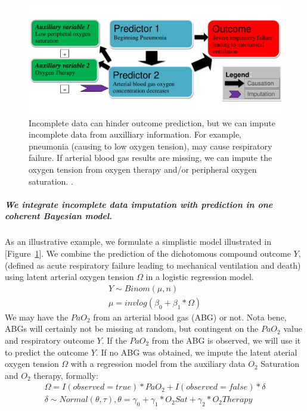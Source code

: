 \documentclass[11pt,notitlepage]{article}
\begin{document}
\begin{figure} 
 \vspace{-30pt}
 \includegraphics[scale=0.4]{Figures/Bayesian_imputation.pdf}
    \vspace{-20pt}
  \caption{\footnotesize Incomplete data can hinder outcome prediction, but we can impute incomplete data from auxilliary information. For example, pneumonia (causing to low oxygen tension), may cause respiratory failure. If arterial blood gas results are missing, we can impute the oxygen tension from oxygen therapy and/or peripheral oxygen saturation. \cite{Hall_25389642}.}
   \vspace{-10pt}
    \label{fig:Imputation_fig}
\end{figure}

\subparagraph{We integrate incomplete data imputation with prediction in one coherent Bayesian model.}
As an illustrative example, we formulate a simplistic model illustrated in [Figure~\ref{fig:Imputation_fig}]. We combine the prediction of the dichotomous compound outcome $Y$,(defined as acute respiratory failure leading to mechanical ventilation and death) using latent arterial oxygen tension $\Omega$ in a logistic regression model. 
\begin{align}
Y \sim Binom(\mu, n) \\
\mu = invlog(\beta_{0} + \beta_{1} * \Omega)
\end{align} 
We may have the $PaO_{2}$ from an arterial blood gas (ABG) or not. Nota bene, ABGs will certainly not be missing at random, but contingent on the $PaO_2$ value and respiratory outcome $Y$. If the $PaO_{2}$ from the ABG is observed, we will use it to predict the outcome $Y$. If no ABG was obtained, we impute the latent aterial oxygen tension $\Omega$ with a regression model from the auxiliary data  $O_{2}$ Saturation and $O_{2}$ therapy, formally:
\begin{align}
\Omega =  I(observed = true) * PaO_{2}   +   I(observed = false) * \delta  \\ 
\delta \sim Normal(\theta, \tau), 
\theta = \gamma_{0} + \gamma_{1}* O_{2} Sat + \gamma_{2} * O_{2} Therapy
\end{align}
\end{document}
